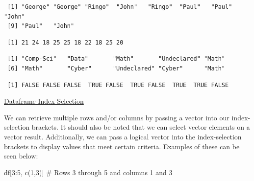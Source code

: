 \documentclass[
  letterpaper,
  DIV=11,
  numbers=noendperiod]{scrreprt}
\newenvironment{Shaded}{\begin{snugshade}}{\end{snugshade}}
\newcommand{\CommentTok}[1]{\textcolor[rgb]{0.37,0.37,0.37}{#1}}
\newcommand{\DecValTok}[1]{\textcolor[rgb]{0.68,0.00,0.00}{#1}}
\newcommand{\FunctionTok}[1]{\textcolor[rgb]{0.28,0.35,0.67}{#1}}
\newcommand{\NormalTok}[1]{\textcolor[rgb]{0.00,0.23,0.31}{#1}}
\newcommand{\SpecialCharTok}[1]{\textcolor[rgb]{0.37,0.37,0.37}{#1}}
\begin{document}
\begin{verbatim}
 [1] "George" "George" "Ringo"  "John"   "Ringo"  "Paul"   "Paul"   "John"  
 [9] "Paul"   "John"  
\end{verbatim}

\begin{Shaded}
\end{Shaded}

\begin{verbatim}
 [1] 21 24 18 25 25 18 22 18 25 20
\end{verbatim}

\begin{Shaded}
\end{Shaded}

\begin{verbatim}
 [1] "Comp-Sci"   "Data"       "Math"       "Undeclared" "Math"      
 [6] "Math"       "Cyber"      "Undeclared" "Cyber"      "Math"      
\end{verbatim}

\begin{Shaded}
\end{Shaded}

\begin{verbatim}
 [1] FALSE FALSE FALSE  TRUE FALSE  TRUE FALSE  TRUE  TRUE FALSE
\end{verbatim}

\begin{watch}{}{}
    \href{https://youtu.be/Sgaa-F_HEYo}{Dataframe Index Selection}
\end{watch}

We can retrieve multiple rows and/or columns by passing a vector into
our index-selection brackets. It should also be noted that we can select
vector elements on a vector result. Additionally, we can pass a logical
vector into the index-selection brackets to display values that meet
certain criteria. Examples of these can be seen below:

\begin{Shaded}
\begin{Highlighting}[]
\NormalTok{df[}\DecValTok{3}\SpecialCharTok{:}\DecValTok{5}\NormalTok{, }\FunctionTok{c}\NormalTok{(}\DecValTok{1}\NormalTok{,}\DecValTok{3}\NormalTok{)] }\CommentTok{\# Rows 3 through 5 and columns 1 and 3 }
\end{Highlighting}
\end{Shaded}
\end{document}
